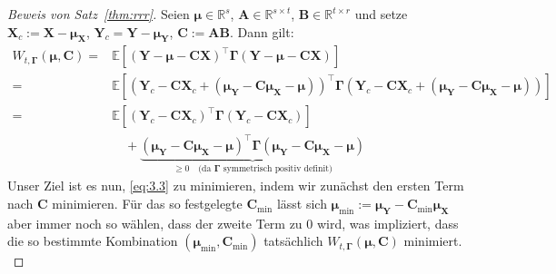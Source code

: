 \documentclass[]{article}
\newcommand{\E}{\mathbb{E}}
\newcommand{\R}{\mathbb{R}}
\newcommand{\X}{\mathbf{X}}
\newcommand{\Y}{\mathbf{Y}}
\newcommand{\muu}{\bm{\mu}}
\newcommand{\C}{\mathbf{C}}
\newcommand{\A}{\mathbf{A}}
\newcommand{\B}{\mathbf{B}}
\newcommand{\Ggamma}{\mathbf{\Gamma}}
\begin{document}
\begin{proof}[Beweis von Satz~\ref{thm:rrr}]
	Seien $\muu \in \R^s$, $\A \in \R^{s \times t}$, $\B \in \R^{t \times r}$ und setze $\X_c := \X - \muu_\X$, $\Y_c = \Y - \muu_\Y$, $\C := \A \B$. 
	Dann gilt:
	\begin{align*}
		W_{t, \Ggamma}(\muu, \C) ={}& \E[(\Y - \muu - \C \X)^\top \Ggamma (\Y - \muu - \C \X)] \\
		={}& \E[(\Y_c - \C \X_c + (\muu_\Y - \C \muu_\X - \muu))^\top \Ggamma (\Y_c - \C \X_c + (\muu_\Y - \C \muu_\X - \muu))] \\
		={}& \E[(\Y_c - \C \X_c)^\top \Ggamma (\Y_c - \C \X_c)] \\
		   & \quad + \underbrace{(\muu_\Y - \C \muu_\X - \muu)^\top \Ggamma (\muu_\Y - \C \muu_\X - \muu)}_{\geq 0 \quad \text{(da } \Ggamma \text{ symmetrisch positiv definit)}} \label{eq:3.3} \tag{3.3}
	\end{align*} 
	Unser Ziel ist es nun, \eqref{eq:3.3} zu minimieren, indem wir zunächst den ersten Term nach $\C$ minimieren. Für das so festgelegte $\C_{\min}$ lässt sich $\muu_{\min} := \muu_\Y - \C_{\min} \muu_\X$ aber immer noch so wählen, dass der zweite Term zu $0$ wird, was impliziert, dass die so bestimmte Kombination $(\muu_{\min}, \C_{\min})$ tatsächlich $W_{t, \Ggamma}(\muu, \C)$ minimiert. \\


\end{proof}
\end{document}
